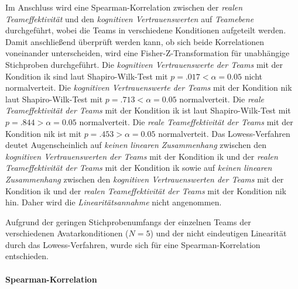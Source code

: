 \documentclass[a4paper,11pt]{article}%
\renewcommand{\\}{\vspace*{0.5\baselineskip} \newline}
\begin{document}
Im Anschluss wird eine Spearman-Korrelation zwischen der \textit{realen Teameffektivität} und den \textit{kognitiven Vertrauenswerten} auf \textit{Teamebene} durchgeführt, wobei die Teams in verschiedene Konditionen aufgeteilt werden. Damit anschließend überprüft werden kann, ob sich beide Korrelationen voneinander unterscheiden, wird eine Fisher-Z-Transformation für unabhängige Stichproben durchgeführt.\\
%
Die \textit{kognitiven Vertrauenswerte der Teams} mit der Kondition \ac{ik} sind laut Shapiro-Wilk-Test mit $p = .017 < \alpha = 0.05$ nicht normalverteit. \newline
Die \textit{kognitiven Vertrauenswerte der Teams} mit der Kondition \ac{nik} laut Shapiro-Wilk-Test mit $p = .713 < \alpha = 0.05$ normalverteit. \newline
Die \textit{reale Teameffektivität der Teams} mit der Kondition \ac{ik} ist laut Shapiro-Wilk-Test mit $p = .844 > \alpha = 0.05$ normalverteit. \newline
Die \textit{reale Teameffektivität der Teams} mit der Kondition \ac{nik} ist mit $p = .453 > \alpha = 0.05$ normalverteit. \\
Das Lowess-Verfahren deutet Augenscheinlich auf \textit{keinen linearen Zusammenhang} zwischen den \textit{kognitiven Vertrauenswerten der Teams} mit der Kondition \ac{ik} und der \textit{realen Teameffektivität der Teams} mit der Kondition \ac{ik} sowie auf \textit{keinen linearen Zusammenhang} zwischen den \textit{kognitiven Vertrauenswerten der Teams} mit der Kondition \ac{ik} und der  \textit{realen Teameffektivität der Teams} mit der Kondition \ac{nik} hin. Daher wird die \textit{Linearitätsannahme} nicht angenommen.

Aufgrund der geringen Stichprobenumfangs der einzelnen Teams der verschiedenen Avatarkonditionen ($N=5$) und der nicht eindeutigen Linearität durch das Lowess-Verfahren, wurde sich für eine Spearman-Korrelation entschieden.

\paragraph{Spearman-Korrelation}
\end{document}
